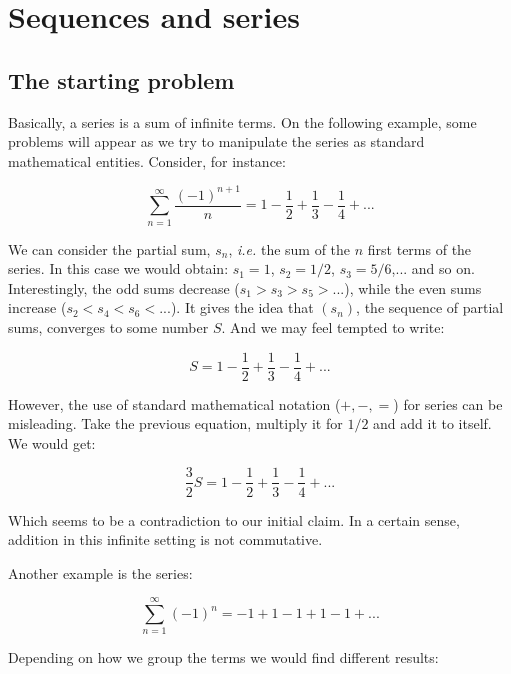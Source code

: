 \chapter{Sequences and series}

\section{The starting problem}

Basically, a series is a sum of infinite terms. On the following example, some problems will appear as we try to manipulate the series as standard mathematical entities. Consider, for instance:

\begin{equation}
    \sum \limits_{n=1}^\infty \frac{(-1)^{n+1}}{n} = 1 - \frac{1}{2} + \frac{1}{3} - \frac{1}{4} + ...
\end{equation}

We can consider the partial sum, $s_n$, \emph{i.e.} the sum of the $n$ first terms of the series. In this case we would obtain: $s_1 = 1$, $s_2 = 1/2$, $s_3 = 5/6$,... and so on. Interestingly, the odd sums decrease ($s_1 > s_3 > s_5 > ...$), while the even sums increase ($s_2 < s_4 < s_6 < ...$). It gives the idea that $(s_n)$, the sequence of partial sums, converges to some number $S$. And we may feel tempted to write:

\begin{equation*}
    S = 1 - \frac{1}{2} + \frac{1}{3} - \frac{1}{4} + ...
\end{equation*}

However, the use of standard mathematical notation ($+, -, =$) for series can be misleading. Take the previous equation, multiply it for $1/2$ and add it to itself. We would get:

\begin{equation*}
    \frac{3}{2}S = 1 - \frac{1}{2} + \frac{1}{3} - \frac{1}{4} + ...
\end{equation*}

Which seems to be a contradiction to our initial claim. In a certain sense, addition in this infinite setting is not commutative.

Another example is the series:

\begin{equation}
    \sum \limits_{n=1}^\infty (-1)^n = -1 + 1 - 1 + 1 - 1 + ...
\end{equation}

Depending on how we group the terms we would find different results:

